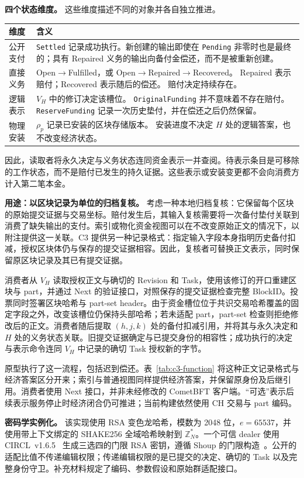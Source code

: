 \noindent\textbf{四个状态维度。}
这些维度描述不同的对象并各自独立推进。

\par\smallskip
{\small
\setlength{\tabcolsep}{3pt}
\noindent
\begin{tabular}{@{}p{}p{}@{}}
\toprule
维度 & 含义 \\
\midrule
公开支付 &
\texttt{Settled} 记录成功执行。新创建的输出即使在 \texttt{Pending} 非零时也是最终的；具有 Repaired 义务的输出向备付金偿还，而不是被重新创建。 \\

直接义务 &
Open$\to$Fulfilled，或 Open$\to$Repaired$\to$Recovered。
Repaired 表示赔付；Recovered 表示随后的偿还。
赔付决定持续存在。 \\

逻辑表示 &
$V_H$ 中的修订决定该槽位。
\texttt{OriginalFunding} 并不意味着不存在赔付。
\texttt{ReserveFunding} 记录一次历史垫付，并在偿还之后仍然保留。 \\

物理安装 &
$\rho_p$ 记录已安装的区块存储版本。
安装进度不决定 $H$ 处的逻辑答案，也不改变经济状态。 \\
\bottomrule
\end{tabular}
\par}

因此，读取者将永久决定与义务状态连同资金表示一并查阅。待表示条目是可移除的工作状态，而不是赔付已发生的持久证据。这些表示或安装变更都不会向消费方计入第二笔本金。

\noindent\textbf{用途：以区块记录为单位的归档复核。}
考虑一种本地归档复核：它保留每个区块的原始提交证据与交易坐标。赔付发生后，其输入复核需要将一次备付垫付关联到消费了缺失输出的支付。索引或物化资金视图可以在不改变原始正文的情况下，以附注提供这一关联。C3 提供另一种记录格式：指定输入字段本身指明历史备付扣减，授权区块体仍与保存的提交证据相容。因此，复核者可替换正文表示，同时保留原区块记录及其已有提交证据。

消费者从 $V_H$ 读取授权正文与确切的 Revision 和 Task，使用该修订的开口重建区块与 part，并通过 Next 的验证接口，对照保存的提交证据检查完整 BlockID。投票同时签署区块哈希与 part-set header。由于资金槽位位于共识交易哈希覆盖的固定字段之外，改变该槽位仍保持头部哈希；若未适配 part，part-set 检查则拒绝修改后的正文。消费者随后提取 $(h,j,k)$ 处的备付扣减引用，并将其与永久决定和 $H$ 处的义务状态关联。旧提交证据确定与已提交身份的相容性；成功执行的决定与表示命令连同 $V_H$ 中记录的确切 Task 授权新的字节。

原型执行了这一流程，包括迟到偿还。表~\ref{tab:c3-function} 将这种正文记录格式与经济答案区分开来；索引与普通视图同样提供经济答案，并保留原身份及后继引用。消费者使用 Next 接口，并非未经修改的 CometBFT 客户端。“可选”表示后续表示服务停止时经济闭合仍可推进；当前构建依然使用 CH 交易与 part 编码。

\noindent\textbf{密码学实例化。}
该实现使用 RSA 变色龙哈希，模数为 2048 位，$e=65537$，并使用带上下文绑定的 SHAKE256 全域哈希映射到 $\mathbb Z_N^*$。一个可信 dealer 使用 CIRCL~v1.6.5~\cite{circl} 生成三选四的门限 RSA 密钥，遵循 Shoup 的门限构造~\cite{shoup}。公开的适配比值不传递编辑权限；传递编辑权限的是已提交的决定、确切的 Task 以及完整身份守卫。补充材料规定了编码、参数假设和原始群适配接口。
